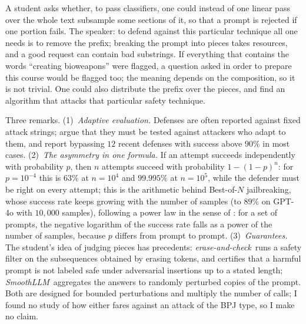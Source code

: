 \begin{discussion}
A student asks whether, to pass classifiers, one could instead of one linear pass over the whole text subsample some sections of it, so that a prompt is rejected if one portion fails. The speaker: to defend against this particular technique all one needs is to remove the prefix; breaking the prompt into pieces takes resources, and a good request can contain bad substrings. If everything that contains the words ``creating bioweapons'' were flagged, a question asked in order to prepare this course would be flagged too; the meaning depends on the composition, so it is not trivial. One could also distribute the prefix over the pieces, and find an algorithm that attacks that particular safety technique.
\end{discussion}

\begin{beyond}
Three remarks. (1)~\emph{Adaptive evaluation.} Defenses are often reported against fixed attack strings; \citet{nasr2025} argue that they must be tested against attackers who adapt to them, and report bypassing $12$ recent defenses with success above $90\%$ in most cases. (2)~\emph{The asymmetry in one formula.} If an attempt succeeds independently with probability $p$, then $n$ attempts succeed with probability $1-(1-p)^n$: for $p=10^{-4}$ this is $63\%$ at $n=10^4$ and $99.995\%$ at $n=10^5$, while the defender must be right on every attempt; this is the arithmetic behind Best-of-$N$ jailbreaking, whose success rate keeps growing with the number of samples (to $89\%$ on GPT-4o with $10{,}000$ samples), following a power law in the sense of \citet{hughes2024}: for a set of prompts, the negative logarithm of the success rate falls as a power of the number of samples, because $p$ differs from prompt to prompt. (3)~\emph{Guarantees.} The student's idea of judging pieces has precedents: \emph{erase-and-check}\,\citep{kumar2023} runs a safety filter on the subsequences obtained by erasing tokens, and certifies that a harmful prompt is not labeled safe under adversarial insertions up to a stated length; \emph{SmoothLLM}\,\citep{robey2023} aggregates the answers to randomly perturbed copies of the prompt. Both are designed for bounded perturbations and multiply the number of calls; I found no study of how either fares against an attack of the BPJ type, so I make no claim.
\end{beyond}


